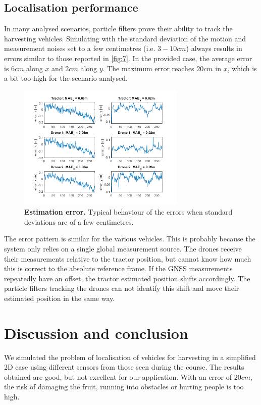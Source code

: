 \documentclass[letterpaper,twocolumn,10pt]{article}
\begin{document}
\subsection*{Localisation performance}
In many analysed scenarios, particle filters prove their ability to track the harvesting vehicles. Simulating with the standard deviation of the motion and measurement noises set to a few centimetres (i.e. $3-10cm$) always results in errors similar to those reported in \autoref{fig:7}. In the provided case, the average error is $6cm$ along $x$ and $2cm$ along $y$. The maximum error reaches $20cm$ in $x$, which is a bit too high for the scenario analysed.

\begin{figure}[!htp]
    \centering
     \includegraphics[width=8cm]{images/final_error.png}
     \caption{\textbf{Estimation error.} Typical behaviour of the errors when standard deviations are of a few centimetres.}
    \label{fig:7}
\end{figure}
The error pattern is similar for the various vehicles. This is probably because the system only relies on a single global measurement source. The drones receive their measurements relative to the tractor position, but cannot know how much this is correct to the absolute reference frame. If the GNSS measurements repeatedly have an offset, the tractor estimated position shifts accordingly. The particle filters tracking the drones can not identify this shift and move their estimated position in the same way.




\section{Discussion and conclusion}
We simulated the problem of localisation of vehicles for harvesting in a simplified 2D case using different sensors from those seen during the course.
The results obtained are good, but not excellent for our application. With an error of $20cm$, the risk of damaging the fruit, running into obstacles or hurting people is too high. 
\end{document}
